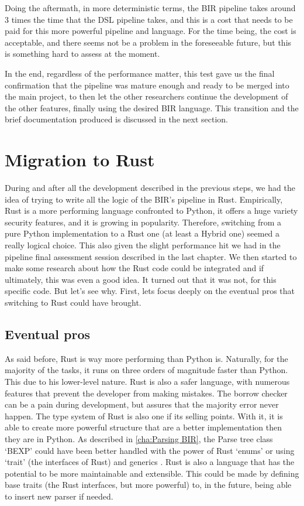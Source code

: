 Doing the aftermath, in more deterministic terms, the BIR pipeline takes around
3 times the time that the DSL pipeline takes, and this is a cost that needs to be
paid for this more powerful pipeline and language. For the time being, the cost is
acceptable, and there seems not be a problem in the foreseeable future, but this
is something hard to assess at the moment.

In the end, regardless of the performance matter, this test gave us the final confirmation
that the pipeline was mature enough and ready to be merged into the main project,
to then let the other researchers continue the development of the other features,
finally using the desired BIR language. This transition and the brief
documentation produced is discussed in the next section.

\chapter{Migration to Rust}
\label{cha:Migration to Rust} During and after all the development described in the
previous steps, we had the idea of trying to write all the logic of the BIR's
pipeline in Rust. Empirically, Rust is a more performing language confronted to
Python, it offers a huge variety security features, and it is growing in
popularity. Therefore, switching from a pure Python implementation to a Rust one
(at least a Hybrid one) seemed a really logical choice. This also given the slight
performance hit we had in the pipeline final assessment session described in the
last chapter. We then started to make some research about how the Rust code
could be integrated and if ultimately, this was even a good idea. It turned out
that it was not, for this specific code. But let's see why. First, lets focus
deeply on the eventual pros that switching to Rust could have brought.

\section[Eventual pros]{Eventual pros}
As said before, Rust is way more performing than Python is. Naturally, for the majority
of the tasks, it runs on three orders of magnitude faster than Python. This due to
his lower-level nature. Rust is also a safer language, with numerous features that
prevent the developer from making mistakes. The borrow checker can be a pain
during development, but assures that the majority error never happen. The type
system of Rust is also one if its selling points. With it, it is able to create
more powerful structure that are a better implementation then they are in Python.
As described in \cref{cha:Parsing BIR}, the Parse tree class `BEXP' could have
been better handled with the power of Rust `enums' or using `trait' (the interfaces
of Rust) and generics . Rust is also a language that has the potential to be
more maintainable and extensible. This could be made by defining base traits (the
Rust interfaces, but more powerful) to, in the future, being able to insert new
parser if needed.

